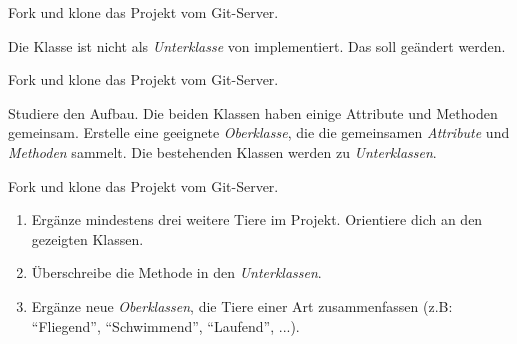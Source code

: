 \documentclass[10pt, a4paper]{arbeitsblatt}
\begin{document}
\ReiheTitel

\begin{aufgabe}[icon=\iconComputer]
	Fork und klone das Projekt  vom Git-Server.

	Die Klasse  ist nicht als \emph{Unterklasse} von  implementiert. Das soll geändert werden.
\end{aufgabe}

\begin{aufgabe}[icon=\iconComputer]
	Fork und klone das Projekt  vom Git-Server.

	Studiere den Aufbau. Die beiden Klassen haben einige Attribute und Methoden gemeinsam. Erstelle eine geeignete \emph{Oberklasse}, die die gemeinsamen \emph{Attribute} und \emph{Methoden} sammelt. Die bestehenden Klassen werden zu \emph{Unterklassen}.
\end{aufgabe}

\begin{aufgabe}[icon=\iconComputer]
	Fork und klone das Projekt  vom Git-Server.

	\begin{enumerate}
		\item Ergänze mindestens drei weitere Tiere im Projekt. Orientiere dich an den gezeigten Klassen.
		\item Überschreibe die Methode  in den \emph{Unterklassen}.
		\item Ergänze neue \emph{Oberklassen}, die Tiere einer Art zusammenfassen (z.B: \enquote{Fliegend}, \enquote{Schwimmend}, \enquote{Laufend}, ...).
	\end{enumerate}
\end{aufgabe}
\end{document}
